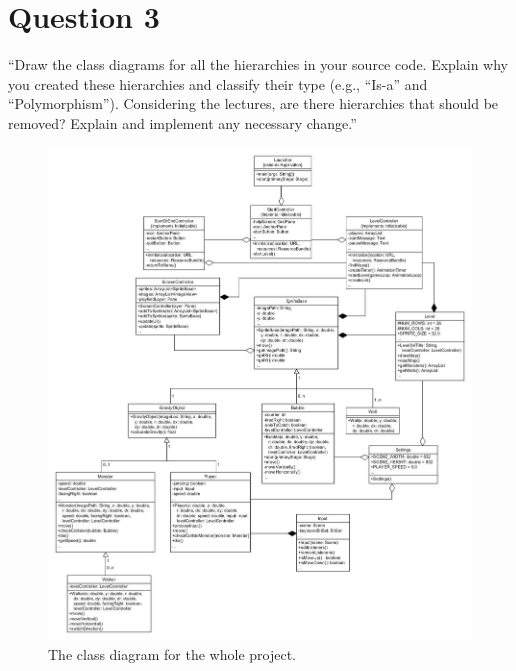 \section{Question 3}

``Draw the class diagrams for all the hierarchies in your source code. Explain why you created these
hierarchies and classify their type (e.g., “Is-a” and “Polymorphism”). Considering the lectures, are
there hierarchies that should be removed? Explain and implement any necessary change.''
\\

\begin{figure}[h]
\centering
\includegraphics[width=\textwidth]{classDiagramsUML_3.jpg}
\caption{The class diagram for the whole project.}
\end{figure}

